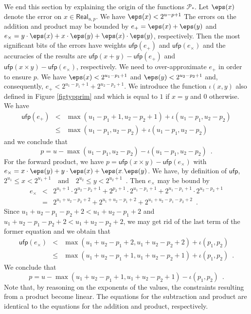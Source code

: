 







We end this section by explaining the origin of the functions
$\mathcal{P}_\ast$. Let
$\eps(x)$ denote the error on $x\in\mathsf{Real}_{u,p}$. We have $\eps(x)< 2^{u-p+1}$
 The errors on the addition and product may be bounded
by $e_+=\eps(x)+\eps(y)$ and $e_\times=y\cdot\eps(x)+x\cdot \eps(y)+ \eps(x)\cdot \eps(y)$,
respectively. Then the most significant bits of the errors have weights $\mathsf{ufp}(e_+)$ and $\mathsf{ufp}(e_\times)$
and the accuracies of the results are $\mathsf{ufp}(x + y)-\mathsf{ufp}(e_+)$ and $\mathsf{ufp}(x \times y)-\mathsf{ufp}(e_\times)$,
respectively.
We need to over-approximate $e_+$ in order to ensure $p$. 
We have
$
\eps(x)< 2^{u_1-p_1+1}$ and $\eps(y)< 2^{u_2-p_2+1}
$
and, consequently,
$
e_+ < 2^{u_1-p_1+1}+  2^{u_2-p_2+1}.
$
We introduce the function $\iota(x,y)$ also
defined in Figure \ref{figtypprim} and which is equal to $1$ if $x=y$ and $0$ otherwise.
 We have
$$
\begin{array}{rcl}
\mathsf{ufp}(e_+) &<& \max(u_1-p_1+1,u_2-p_2+1)+\iota(u_1-p_1,u_2-p_2) \\
          &\le& \max(u_1-p_1,u_2-p_2)+\iota(u_1-p_1,u_2-p_2)
\end{array}$$
and we conclude that 
\begin{equation}
p = u-\max(u_1-p_1,u_2-p_2)-\iota(u_1-p_1,u_2-p_2)\enspace .
\end{equation}
For the forward product, we have
$p	= \mathsf{ufp}(x\times y)-\mathsf{ufp}(e_\times)$ with $e_\times=x\cdot \eps(y)+y\cdot \eps(x)+\eps(x_\cdot\eps(y)$. 
We have, by definition of $\mathsf{ufp}$,
$
2^{u_1} \le x < 2^{u_1+1}\quad\text{and}\quad 2^{u_2} \le y< 2^{u_2+1}\enspace.
$
Then $e_\times$ may be bound by
$$
\begin{array}{rcl}
e_\times &<& 2^{u_1+1}\cdot 2^{u_2-p_2+1} + 2^{p_2+1}\cdot 2^{u_1-p_1+1}+ 2^{u_1-p_1+1}\cdot 2^{u_2-p_2+1}\\
            &=& 2^{u_1+u_2-p_2+2}+ 2^{u_1+u_2-p_1+2}+ 2^{u_1+u_2-p_1-p_2+2} \enspace.
\end{array}
$$
Since $u_1+u_2-p_1-p_2+2< u_1+u_2-p_1+2$ and $u_1+u_2-p_1-p_2+2< u_1+u_2-p_2+2$, 
we may get rid of the last term of the former equation and we
obtain that
$$
\begin{array}{rcl}
\mathsf{ufp}(e_\times) &<& \max(u_1+u_2-p_1+2,u_1+u_2-p_2+2)+\iota(p_1,p_2)\\
&\le & \max(u_1+u_2-p_1+1,u_1+u_2-p_2+1)+\iota(p_1,p_2)\enspace.
\end{array}
$$
We conclude that
\begin{equation}
p = u-\max(u_1+u_2-p_1+1,u_1+u_2-p_2+1)-\iota(p_1,p_2)\enspace .
\end{equation}
Note that, by reasoning on the exponents of the values, the constraints resulting from a product become linear.
The equations for the subtraction and product are identical to the equations for the addition and product, 
respectively.


